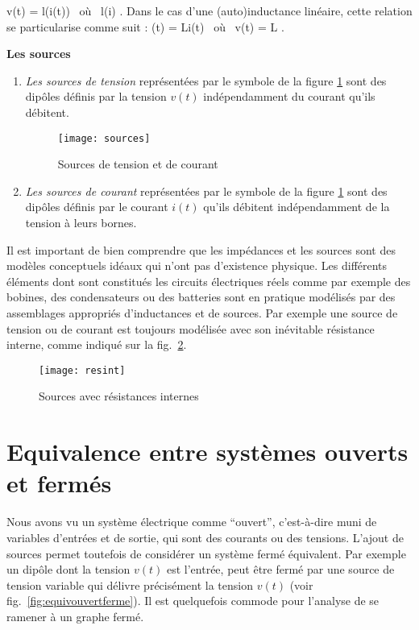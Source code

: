 \begin{description}
\begin{enumerate}
\eqnn
v(t) =  l(i(t)) 
\mbox{ où } l(i) \triangleq  {}.
\eeqnn
Dans le cas d'une (auto)inductance linéaire, cette relation se
particularise comme suit :
\eqnn
\phi(t) = Li(t) \;\; \mbox{ où } v(t) = L .
\eeqnn
\end{enumerate}
\item{\bf Les sources}
\begin{enumerate}
\item {\em Les sources de tension} représentées par le symbole de
la figure \ref{fig:sources} sont des dip{ô}les définis par la
tension $v(t)$ indépendam\-ment du courant qu'ils débitent.
\begin{figure}[htbp]
\begin{center}
\texttt{[image: sources]}
\caption{Sources de tension et de courant}
\label{fig:sources}
\end{center}
\end{figure}
\item{\em Les sources de courant} représentées par le symbole de
la figure \ref{fig:sources} sont des dip{ô}les définis par le
courant $i(t)$ qu'ils débitent indépendamment de la tension à
leurs bornes. 
\end{enumerate} 
\end{description}
Il est important de bien comprendre que les impédances et les sources sont des modèles conceptuels idéaux qui n'ont pas d'existence physique. Les différents éléments dont sont constitués les circuits électriques réels comme par exemple des bobines, des condensateurs ou des batteries sont en pratique modélisés par des assemblages appropriés d'inductances et de sources. Par exemple une source de tension ou de courant est toujours modélisée avec son inévitable résistance interne, comme indiqué sur la fig.~\ref{fig:resint}.

\begin{figure}[t]
\begin{center}
\texttt{[image: resint]}
\caption{Sources avec résistances internes}
\label{fig:resint}
\end{center}
\end{figure}


\section{Equivalence entre systèmes ouverts et fermés}

Nous avons vu un système électrique comme ``ouvert'', c'est-à-dire muni de variables d'entrées et de sortie, qui sont des courants ou des tensions. L'ajout de sources permet toutefois de considérer un système fermé équivalent. Par exemple un dipôle dont la tension $v(t)$ est l'entrée, peut être fermé par une source de tension variable qui délivre précisément la tension $v(t)$ (voir fig.~\ref{fig:equivouvertferme}). Il est quelquefois commode pour l'analyse de se ramener à un graphe fermé.


